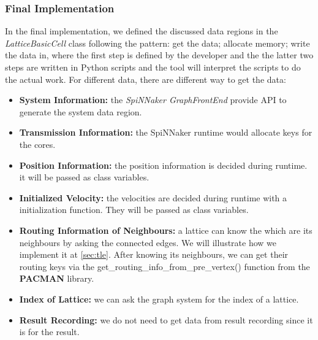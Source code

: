 \subsubsection{Final Implementation}
In the final implementation, we defined the discussed data regions in the \textit{LatticeBasicCell} class following the pattern: get the data; allocate memory; write the data in, where the first step is defined by the developer and the the latter two steps are written in Python scripts and the tool will interpret the scripts to do the actual work. For different data, there are different way to get the data:

\begin{itemize}
    \item \textbf{System Information:} the \textit{SpiNNaker GraphFrontEnd} provide API to generate the system data region.
    \item \textbf{Transmission Information:} the SpiNNaker runtime would allocate keys for the cores.
    \item \textbf{Position Information:} the position information is decided during runtime. it will be passed as class variables.
    \item \textbf{Initialized Velocity:} the velocities are decided during runtime with a initialization function. They will be passed as class variables. 
    \item \textbf{Routing Information of Neighbours:} a lattice can know the which are its neighbours by asking the connected edges. We will illustrate how we implement it at \ref{sec:tle}. After knowing its neighbours, we can get their routing keys via the get\_routing\_info\_from\_pre\_vertex() function from the \textbf{PACMAN} library.
    \item \textbf{Index of Lattice:} we can ask the graph system for the index of a lattice.
    \item \textbf{Result Recording:} we do not need to get data from result recording since it is for the result.
\end{itemize}

